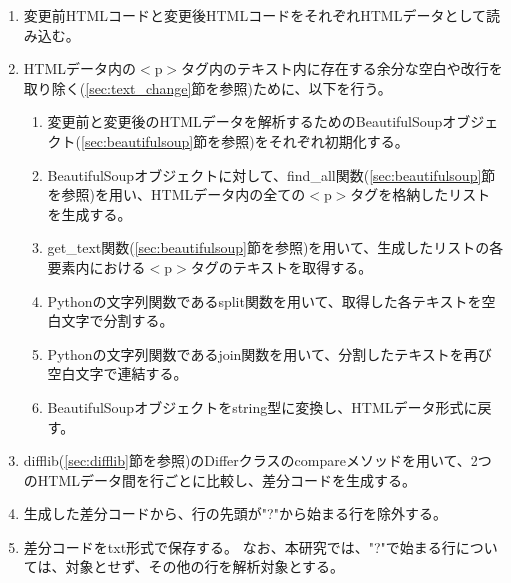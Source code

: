 \begin{enumerate}
    \item 変更前HTMLコードと変更後HTMLコードをそれぞれHTMLデータとして読み込む。
    \item HTMLデータ内の$<$p$>$タグ内のテキスト内に存在する余分な空白や改行を取り除く(\ref{sec:text_change}節を参照)ために、以下を行う。
          \begin{enumerate}
              \item 変更前と変更後のHTMLデータを解析するためのBeautifulSoupオブジェクト(\ref{sec:beautifulsoup}節を参照)をそれぞれ初期化する。
              \item BeautifulSoupオブジェクトに対して、find\_all関数(\ref{sec:beautifulsoup}節を参照)を用い、HTMLデータ内の全ての$<$p$>$タグを格納したリストを生成する。
              \item get\_text関数(\ref{sec:beautifulsoup}節を参照)を用いて、生成したリストの各要素内における$<$p$>$タグのテキストを取得する。
              \item Pythonの文字列関数であるsplit関数を用いて、取得した各テキストを空白文字で分割する。
              \item Pythonの文字列関数であるjoin関数を用いて、分割したテキストを再び空白文字で連結する。
              \item BeautifulSoupオブジェクトをstring型に変換し、HTMLデータ形式に戻す。
          \end{enumerate}
    \item difflib(\ref{sec:difflib}節を参照)のDifferクラスのcompareメソッドを用いて、2つのHTMLデータ間を行ごとに比較し、差分コードを生成する。
    \item 生成した差分コードから、行の先頭が"?"から始まる行を除外する。
    \item 差分コードをtxt形式で保存する。
          なお、本研究では、"?"で始まる行については、対象とせず、その他の行を解析対象とする。
\end{enumerate}



